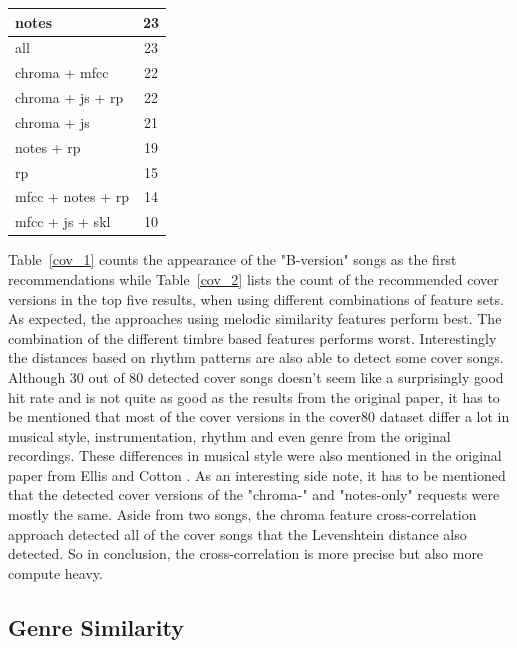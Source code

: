 \begin{table}[H]
\begin{minipage}{0.5\textwidth}
\begin{center}
\begin{tabular}{|l||c|}
				\hline
				notes & 23\\
				\hline
				all & 23\\
				\hline
				chroma + mfcc & 22\\
				\hline
				chroma + js + rp & 22\\
				\hline
				chroma + js & 21\\
				\hline
				notes + rp & 19\\
				\hline
				rp & 15\\
				\hline
				mfcc + notes + rp & 14\\
				\hline
				mfcc + js + skl & 10\\
				\hline
			\end{tabular}
		\end{center}
	\end{minipage}
\end{table}

\noindent Table~\ref{cov_1} counts the appearance of the "B-version" songs as the first recommendations while Table~\ref{cov_2} lists the count of the recommended cover versions in the top five results, when using different combinations of feature sets. As expected, the approaches using melodic similarity features perform best. The combination of the different timbre based features performs worst. Interestingly the distances based on rhythm patterns are also able to detect some cover songs.\\
\noindent Although 30 out of 80 detected cover songs doesn't seem like a surprisingly good hit rate and is not quite as good as the results from the original paper, it has to be mentioned that most of the cover versions in the cover80 dataset differ a lot in musical style, instrumentation, rhythm and even genre from the original recordings. These differences in musical style were also mentioned in the original paper from Ellis and Cotton \cite[p. 3]{cover802}.
\noindent As an interesting side note, it has to be mentioned that the detected cover versions of the "chroma-" and "notes-only" requests were mostly the same. Aside from two songs, the chroma feature cross-correlation approach detected all of the cover songs that the Levenshtein distance also detected. So in conclusion, the cross-correlation is more precise but also more compute heavy.


\subsection{Genre Similarity}\label{genrerec}

